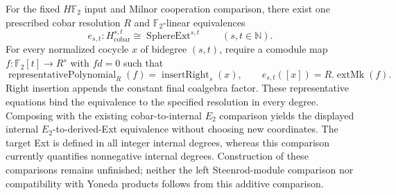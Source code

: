 \begin{theorem}
  \label{thm:cobar-derived-comodule-ext-comparison}
  For the fixed $H\mathbb F_2$ input and Milnor cooperation comparison,
  there exist one prescribed cobar resolution $R$ and $\mathbb F_2$-linear
  equivalences
  \[
    e_{s,t}:H^{s,t}_{\mathrm{cobar}}\cong
       \operatorname{SphereExt}^{s,t}\qquad(s,t\in\mathbb N).
  \]
  For every normalized cocycle $x$ of bidegree $(s,t)$, require a comodule
  map $f:\mathbb F_2[t]\to R^s$ with $fd=0$ such that
  \[
    \operatorname{representativePolynomial}_R(f)
       =\operatorname{insertRight}_s(x),\qquad
    e_{s,t}([x])=R.\operatorname{extMk}(f).
  \]
  Right insertion appends the constant final coalgebra factor. These
  representative equations bind the equivalence to the specified
  resolution in every degree. Composing with the existing cobar-to-internal
  $E_2$ comparison yields the displayed internal $E_2$-to-derived-Ext
  equivalence without choosing new coordinates.
  The target Ext is defined in all integer internal degrees, whereas this
  comparison currently quantifies nonnegative internal degrees.
  Construction of these comparisons remains unfinished; neither the
  left Steenrod-module comparison nor compatibility with Yoneda products
  follows from this additive comparison.
\end{theorem}

